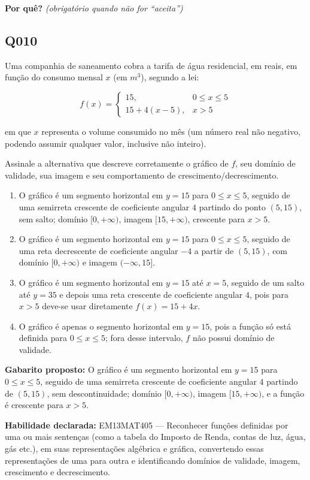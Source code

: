 \documentclass[11pt,a4paper]{article}
\begin{document}
\textbf{Por quê?} \emph{(obrigatório quando não for ``aceita'')}

\underline{\hspace{\linewidth}}

\underline{\hspace{\linewidth}}
\vspace{0.6em}

\begin{samepage}
\subsection*{Q010}
Uma companhia de saneamento cobra a tarifa de água residencial, em reais, em função do consumo mensal $x$ (em $m^3$), segundo a lei:

$$f(x) = \begin{cases} 15, & 0 \le x \le 5 \\ 15 + 4(x-5), & x > 5 \end{cases}$$

em que $x$ representa o volume consumido no mês (um número real não negativo, podendo assumir qualquer valor, inclusive não inteiro).

Assinale a alternativa que descreve corretamente o gráfico de $f$, seu domínio de validade, sua imagem e seu comportamento de crescimento/decrescimento.
\begin{enumerate}[label=(\alph*),nosep,leftmargin=*]
\item O gráfico é um segmento horizontal em $y=15$ para $0\le x\le 5$, seguido de uma semirreta crescente de coeficiente angular $4$ partindo do ponto $(5,15)$, sem salto; domínio $[0,+\infty)$, imagem $[15,+\infty)$, crescente para $x>5$.
\item O gráfico é um segmento horizontal em $y=15$ para $0\le x\le 5$, seguido de uma reta decrescente de coeficiente angular $-4$ a partir de $(5,15)$, com domínio $[0,+\infty)$ e imagem $(-\infty,15]$.
\item O gráfico é um segmento horizontal em $y=15$ até $x=5$, seguido de um salto até $y=35$ e depois uma reta crescente de coeficiente angular $4$, pois para $x>5$ deve-se usar diretamente $f(x)=15+4x$.
\item O gráfico é apenas o segmento horizontal em $y=15$, pois a função só está definida para $0\le x\le 5$; fora desse intervalo, $f$ não possui domínio de validade.
\end{enumerate}

\textbf{Gabarito proposto:} O gráfico é um segmento horizontal em $y=15$ para $0\le x\le 5$, seguido de uma semirreta crescente de coeficiente angular $4$ partindo de $(5,15)$, sem descontinuidade; domínio $[0,+\infty)$, imagem $[15,+\infty)$, e a função é crescente para $x>5$.

\textbf{Habilidade declarada:} EM13MAT405 --- Reconhecer funções definidas por uma ou mais sentenças (como a tabela do Imposto de Renda, contas de luz, água, gás etc.), em suas representações algébrica e gráfica, convertendo essas representações de uma para outra e identificando domínios de validade, imagem, crescimento e decrescimento.
\end{samepage}
\end{document}
